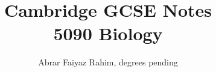 \usepackage{tikz, fancyhdr, siunitx, fancyvrb}
\usepackage[version=4]{mhchem}

\title {Cambridge GCSE Notes \\ 5090 Biology }
\author {Abrar Faiyaz Rahim, degrees pending}
\date{}

\renewcommand*{\thefootnote}{[\arabic{footnote}]}

\pagestyle{fancy}
\fancyhf{}
\fancyhead[L]{\rightmark}
\fancyhead[R]{\thepage}
\renewcommand{\headrulewidth}{0pt}
